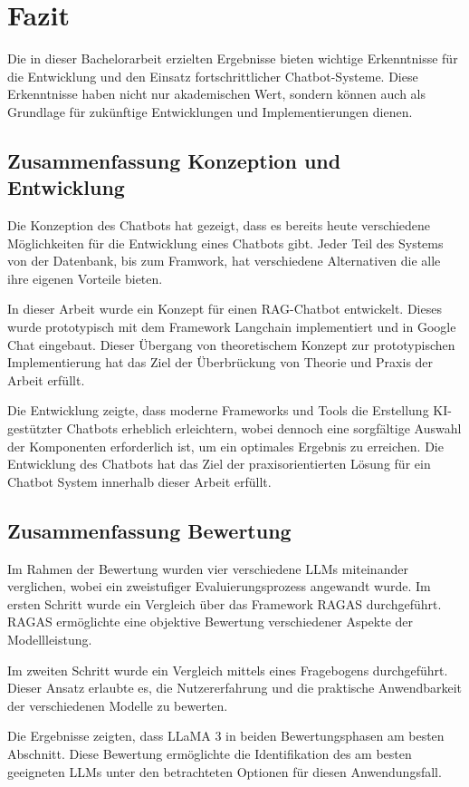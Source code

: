 \chapter{Fazit}
\label{f}

Die in dieser Bachelorarbeit erzielten Ergebnisse bieten 
wichtige Erkenntnisse für die Entwicklung und den Einsatz 
fortschrittlicher Chatbot-Systeme. Diese Erkenntnisse 
haben nicht nur akademischen Wert, sondern können auch 
als Grundlage für zukünftige Entwicklungen und Implementierungen dienen.

\section{Zusammenfassung Konzeption und Entwicklung}
Die Konzeption des Chatbots hat gezeigt, dass es bereits 
heute verschiedene Möglichkeiten für die Entwicklung
eines Chatbots gibt. Jeder Teil des Systems von der 
Datenbank, bis zum Framwork, hat verschiedene
Alternativen die alle ihre eigenen Vorteile bieten. \par

In dieser Arbeit wurde ein Konzept für einen RAG-Chatbot 
entwickelt. Dieses wurde prototypisch mit dem Framework
 Langchain implementiert und in Google Chat eingebaut. 
 Dieser Übergang von theoretischem Konzept zur 
 prototypischen Implementierung hat das Ziel der 
 Überbrückung von Theorie und Praxis der Arbeit erfüllt.\par
 Die Entwicklung zeigte, dass moderne Frameworks 
 und Tools die Erstellung KI-gestützter Chatbots 
 erheblich erleichtern, wobei dennoch eine sorgfältige 
 Auswahl der Komponenten 
 erforderlich ist, um ein optimales Ergebnis zu 
 erreichen. Die Entwicklung des Chatbots hat das 
 Ziel der praxisorientierten Lösung für ein Chatbot 
 System innerhalb dieser Arbeit erfüllt.\par

\section{Zusammenfassung Bewertung}
Im Rahmen der Bewertung wurden vier verschiedene 
LLMs miteinander verglichen, wobei ein zweistufiger 
Evaluierungsprozess angewandt wurde. Im ersten 
Schritt wurde ein Vergleich über das Framework 
RAGAS durchgeführt. 
RAGAS ermöglichte eine objektive Bewertung 
verschiedener Aspekte der Modellleistung.\par
Im zweiten Schritt wurde ein Vergleich mittels eines Fragebogens 
durchgeführt. Dieser Ansatz erlaubte es, die Nutzererfahrung
 und die praktische Anwendbarkeit der verschiedenen Modelle zu bewerten.\par
Die Ergebnisse zeigten, dass LLaMA 3 in beiden Bewertungsphasen am 
besten Abschnitt. Diese Bewertung ermöglichte die Identifikation des 
am besten geeigneten LLMs unter den betrachteten Optionen für 
diesen Anwendungsfall.

